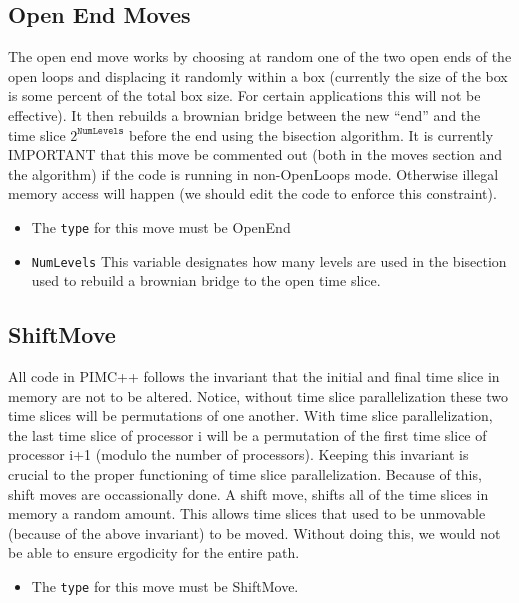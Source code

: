 \documentclass{book}
\begin{document}
\subsection{Open End Moves}
The open end move works by choosing at random one of the two open ends
of the open loops and displacing it randomly within a box (currently
the size of the box is some percent of the total box size. For certain
applications this will not be effective).  It then rebuilds a brownian
bridge between the new ``end'' and the time slice  $2^{\texttt{NumLevels}}$ before the end  using the bisection algorithm.   It is currently IMPORTANT that this move be commented out (both in the moves section and the algorithm) if the code is running in non-OpenLoops mode. Otherwise illegal memory access will happen (we should edit the code to enforce this constraint).
\begin{itemize}
\item The \texttt{type} for this move must be OpenEnd
\item \texttt{NumLevels} This variable designates how many levels are used in the bisection used to rebuild a brownian bridge to the open time slice.
\end{itemize}

\subsection{ShiftMove}
All code in PIMC++ follows the invariant that the initial and final
time slice in memory are not to be altered.   Notice, without time
slice parallelization these two time slices will be permutations of
one another. With time slice parallelization, the last time slice of
processor i will be a permutation of the first time slice of processor
i+1 (modulo the number of processors).  Keeping this invariant is
crucial to the proper functioning of time slice
parallelization. Because of this, shift moves are occassionally
done. A shift move, shifts all of the time slices in memory a random
amount. This allows time slices that used to be unmovable (because of
the above invariant) to be moved.  Without doing this, we would not be
able to ensure ergodicity for the entire path.   
\begin{itemize}
\item The \texttt{type} for this move must be ShiftMove.
\end{itemize}
\end{document}
